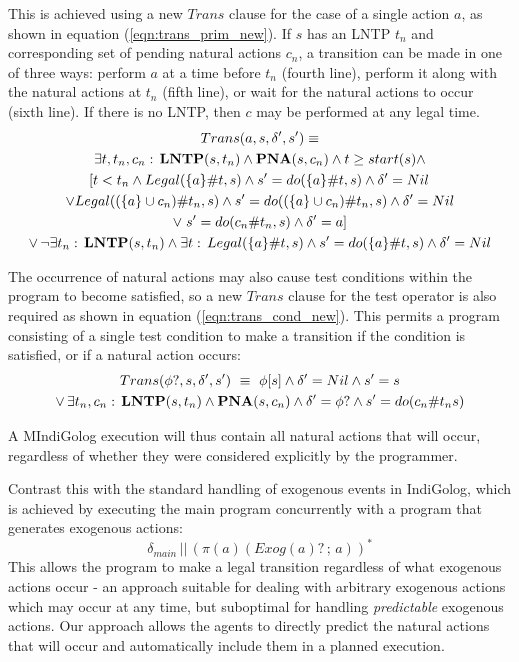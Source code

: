 This is achieved using a new $Trans$ clause for the case of a single
action $a$, as shown in equation (\ref{eqn:trans_prim_new}). If
$s$ has an LNTP $t_{n}$ and corresponding set of pending natural
actions $c_{n}$, a transition can be made in one of three ways: perform
$a$ at a time before $t_{n}$ (fourth line), perform it along with
the natural actions at $t_{n}$ (fifth line), or wait for the natural
actions to occur (sixth line). If there is no LNTP, then $c$ may
be performed at any legal time.\begin{multline}
Trans(a,s,\delta',s')\equiv\\
\exists t,t_{n},c_{n}:\,\mathbf{LNTP}(s,t_{n})\wedge\mathbf{PNA}(s,c_{n})\wedge t\geq start(s)\wedge\\
\left[t<t_{n}\wedge Legal(\{a\}\#t,s)\wedge s'=do(\{a\}\#t,s)\wedge\delta'=Nil\right.\\
\vee Legal((\{a\}\cup c_{n})\#t_{n},s)\wedge s'=do((\{a\}\cup c_{n})\#t_{n},s)\wedge\delta'=Nil\\
\vee\left.s'=do(c_{n}\#t_{n},s)\wedge\delta'=a\right]\\
\vee\,\neg\exists t_{n}:\,\mathbf{LNTP}(s,t_{n})\wedge\exists t:\, Legal(\{a\}\#t,s)\wedge s'=do(\{a\}\#t,s)\wedge\delta'=Nil\label{eqn:trans_prim_new}\end{multline}


The occurrence of natural actions may also cause test conditions within
the program to become satisfied, so a new $Trans$ clause for the
test operator is also required as shown in equation (\ref{eqn:trans_cond_new}).
This permits a program consisting of a single test condition to make
a transition if the condition is satisfied, or if a natural action
occurs: \begin{multline}
Trans(\phi?,s,\delta',s')\,\,\equiv\,\,\phi[s]\wedge\delta'=Nil\wedge s'=s\\
\vee\,\exists t_{n},c_{n}:\,\mathbf{LNTP}(s,t_{n})\wedge\mathbf{PNA}(s,c_{n})\wedge\delta'=\phi?\wedge s'=do(c_{n}\#t_{n}s)\label{eqn:trans_cond_new}\end{multline}


A MIndiGolog execution will thus contain all natural actions that
will occur, regardless of whether they were considered explicitly
by the programmer.

Contrast this with the standard handling of exogenous events in IndiGolog,
which is achieved by executing the main program concurrently with
a program that generates exogenous actions:\[
\delta_{main}\,||\,\left(\pi(a)(Exog(a)?\,;\, a)\right)^{*}\]
 This allows the program to make a legal transition regardless of
what exogenous actions occur - an approach suitable for dealing with
arbitrary exogenous actions which may occur at any time, but suboptimal
for handling \emph{predictable} exogenous actions. Our approach allows
the agents to directly predict the natural actions that will occur
and automatically include them in a planned execution.


